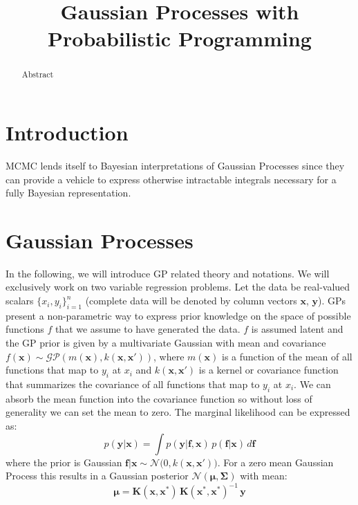 \documentclass{article} %
\title{Gaussian Processes with Probabilistic Programming}
\author{
}
\begin{document}
\maketitle

\begin{abstract}
Abstract
\end{abstract}
\section{Introduction}
MCMC lends itself to Bayesian interpretations of Gaussian Processes since they can provide a vehicle to express otherwise intractable integrals necessary for a fully Bayesian representation.

\section{Gaussian Processes}
In the following, we will introduce GP related theory and notations. We will exclusively work on two variable regression problems. Let the data be real-valued scalars  $\{x_i,y_i\}_{i=1}^n$ (complete data will be denoted by column vectors $\mathbf{x}$, $\mathbf{y}$). GPs present a non-parametric way to express prior knowledge on the space of possible functions  $f$ that we assume to have generated the data.  $f$ is assumed latent and the GP prior is given by a multivariate Gaussian with mean and covariance $f(\mathbf{x})\sim \mathcal{GP}(m(\mathbf{x}),k(\mathbf{x},\mathbf{x}'))$, where $m(\mathbf{x})$ is a function of the mean of all functions that map to $y_i$ at $x_i$ and $k(\mathbf{x},\mathbf{x}')$ is a kernel or covariance function that summarizes the covariance of all functions that map to $y_i$ at $x_i$. We can absorb the mean function into the covariance function so without loss of generality we can set the mean to zero. The marginal likelihood can be expressed as:
\begin{equation}
\label{eq:marg}
p(\mathbf{y}|\mathbf{x}) = \int p(\mathbf{y}|\mathbf{f,x})\, p(\mathbf{f}|\mathbf{x}) \, d\mathbf{f} 
\end{equation}
where the prior is Gaussian $\mathbf{f}|\mathbf{x} \sim \mathcal{N}\big(0,k(\mathbf{x},\mathbf{x}')\big)$. For a zero mean Gaussian Process this results in a Gaussian posterior $\mathcal{N}(\bm{\mu},\bm{\Sigma})$ with mean:
\begin{equation}
\label{eq:conditonalGaussianMean}
\bm{\mu} = \mathbf{K}(\mathbf{x},\mathbf{x}^*)\,\mathbf{K}(\mathbf{x}^*,\mathbf{x}^*)^{-1}\,\mathbf{y}
\end{equation}
\end{document}
